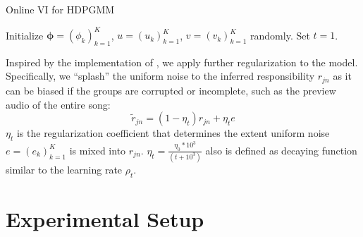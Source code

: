 \documentclass{article}
\begin{document}
\begin{algorithm}
\small
\caption{Online VI for HDPGMM}\label{alg:inference}
Initialize $\mathbf{\phi}=(\phi_{k})^{K}_{k=1}$, $u=(u_{k})^{K}_{k=1}$, $v=(v_{k})^{K}_{k=1}$ randomly. Set $t=1$.\\
\end{algorithm}


Inspired by the implementation of \cite{DBLP:journals/jmlr/WangPB11, 10.1214/06-BA104}, we apply further regularization to the model. Specifically, we ``splash'' the uniform noise to the inferred responsibility $r_{jn}$ as it can be biased if the groups are corrupted or incomplete, such as the preview audio of the entire song:
\begin{equation}\label{eq:additional_regularization}
    \tilde{r}_{jn} = (1 - \eta_{t}) r_{jn} + \eta_{t} e
\end{equation}
$\eta_{t}$ is the regularization coefficient that determines the extent uniform noise $e = (e_{k})_{k=1}^{K}$ is mixed into $r_{jn}$. $\eta_{t} = \frac{\eta_{0} * 10^{3}}{(t + 10^{3})}$ also is defined as decaying function similar to the learning rate $\rho_{t}$.





\section{Experimental Setup}\label{sec:experimental_setup}
\end{document}
